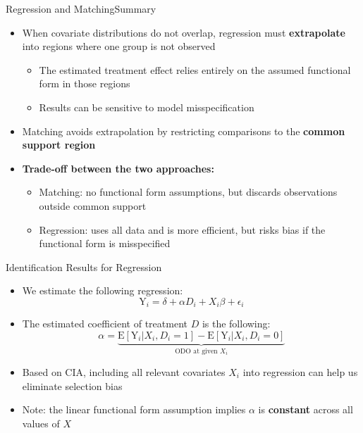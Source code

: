 \documentclass[dvipsnames,hyperref={pdfpagelabels=false}]{beamer}
\begin{document}
\begin{frame}{Regression and Matching}{Summary}
	\begin{itemize}
		\item When covariate distributions do not overlap, regression must \textbf{extrapolate} into regions where one group is not observed
		\vspace{0.3cm}
		\begin{itemize}
			\item The estimated treatment effect relies entirely on the assumed functional form in those regions
			\vspace{0.2cm}
			\item Results can be sensitive to model misspecification
		\end{itemize}
		\vspace{0.3cm}
		\item Matching avoids extrapolation by restricting comparisons to the \textbf{common support region}
		\vspace{0.3cm}
		\item \textbf{Trade-off between the two approaches:}
		\vspace{0.2cm}
		\begin{itemize}
			\item Matching: no functional form assumptions, but discards observations outside common support
			\vspace{0.2cm}
			\item Regression: uses all data and is more efficient, but risks bias if the functional form is misspecified
		\end{itemize}
	\end{itemize}
\end{frame}


\begin{frame}{Identification Results for Regression}
	\begin{itemize}
		\item We estimate the following regression:	
		\begin{equation*}
			\mathrm{Y}_i = \delta + \alpha D_i + X_{i}\beta + \epsilon_{i}
		\end{equation*}	
		\item The estimated coefficient of treatment $D$ is the following:
		\begin{equation*}
			\alpha = \underbrace{\mathrm{E}[\mathrm{Y}_{i}|X_{i},D_{i}=1] - \mathrm{E}[\mathrm{Y}_{i}|X_{i},D_{i}=0]}_{\text{ODO at given $X_{i}$}} 
		\end{equation*}
		\vspace{0.1cm}
		\item Based on CIA, including all relevant covariates $X_{i}$ into regression can help us eliminate selection bias
		\vspace{0.1cm}
		\item Note: the linear functional form assumption implies $\alpha$ is \textbf{constant} across all values of $X$
	\end{itemize}
\end{frame}
\end{document}
